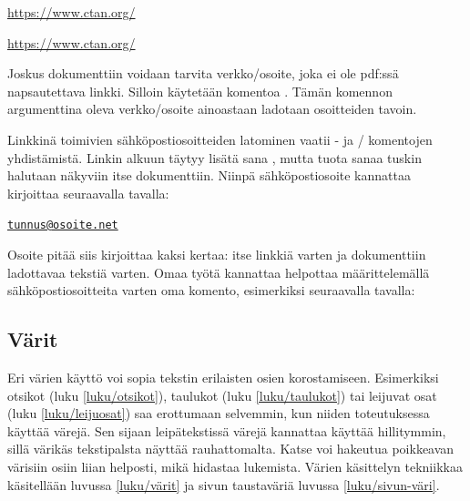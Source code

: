 \begin{koodilohkosis}
\url{https://www.ctan.org/}
\end{koodilohkosis}

\begin{tulossis}
  \url{https://www.ctan.org/}
\end{tulossis}

\noindent
Joskus dokumenttiin voidaan tarvita verkko\-/osoite, joka ei ole pdf:ssä
napsautettava linkki. Silloin käytetään komentoa .
Tämän komennon argumenttina oleva verkko\-/osoite ainoastaan ladotaan
osoitteiden tavoin.

Linkkinä toimivien sähköpostiosoitteiden latominen vaatii
- ja \-/ komentojen yhdistämistä.
Linkin alkuun täytyy lisätä sana , mutta tuota sanaa
tuskin halutaan näkyviin itse dokumenttiin. Niinpä sähköpostiosoite
kannattaa kirjoittaa seuraavalla tavalla:

\begin{koodilohkosis}
\href{mailto:tunnus@osoite.net}{\nolinkurl{tunnus@osoite.net}}
\end{koodilohkosis}

\noindent
Osoite pitää siis kirjoittaa kaksi kertaa: itse linkkiä varten ja
dokumenttiin ladottavaa tekstiä varten. Omaa työtä kannattaa helpottaa
määrittelemällä sähköpostiosoitteita varten oma komento, esimerkiksi
seuraavalla tavalla:

\begin{koodilohkosis}
\newcommand{\sposti}[1]{\href{mailto:#1}{\nolinkurl{#1}}}
\end{koodilohkosis}

\subsection{Värit}

Eri värien käyttö voi sopia tekstin erilaisten osien korostamiseen.
Esimerkiksi otsikot (luku \ref{luku/otsikot}), taulukot (luku
\ref{luku/taulukot}) tai leijuvat osat (luku \ref{luku/leijuosat}) saa
erottumaan selvemmin, kun niiden toteutuksessa käyttää värejä. Sen
sijaan leipätekstissä värejä kannattaa käyttää hillitymmin, sillä
värikäs tekstipalsta näyttää rauhattomalta. Katse voi hakeutua
poikkeavan värisiin osiin liian helposti, mikä hidastaa lukemista.
Värien käsittelyn tekniikkaa käsitellään luvussa \ref{luku/värit} ja
sivun taustaväriä luvussa \ref{luku/sivun-väri}.

